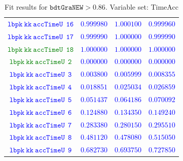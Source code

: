 \documentclass[10pt,a4paper]{article}
\begin{document}
\begin{table}[h!]
{\begin{tabular}{cccc}
\textcolor{blue}{$\mathtt{lbpk~kk~accTimeU~~16}$} & \textcolor{blue}{$0.999980$}& \textcolor{blue}{$1.000100$}& \textcolor{blue}{$0.999960$}\\
\textcolor{blue}{$\mathtt{lbpk~kk~accTimeU~~17}$} & \textcolor{blue}{$0.999990$}& \textcolor{blue}{$1.000000$}& \textcolor{blue}{$0.999990$}\\
\textcolor{Green}{$\mathtt{lbpk~kk~accTimeU~~18}$} & \textcolor{blue}{$1.000000$}& \textcolor{blue}{$1.000000$}& \textcolor{blue}{$1.000000$}\\
\textcolor{Green}{$\mathtt{lbpk~kk~accTimeU~~2}$} & \textcolor{blue}{$0.000000$}& \textcolor{blue}{$0.000000$}& \textcolor{blue}{$0.000000$}\\
\textcolor{blue}{$\mathtt{lbpk~kk~accTimeU~~3}$} & \textcolor{blue}{$0.003800$}& \textcolor{blue}{$0.005999$}& \textcolor{blue}{$0.008355$}\\
\textcolor{blue}{$\mathtt{lbpk~kk~accTimeU~~4}$} & \textcolor{blue}{$0.018851$}& \textcolor{blue}{$0.025034$}& \textcolor{blue}{$0.026859$}\\
\textcolor{blue}{$\mathtt{lbpk~kk~accTimeU~~5}$} & \textcolor{blue}{$0.051437$}& \textcolor{blue}{$0.064186$}& \textcolor{blue}{$0.070092$}\\
\textcolor{blue}{$\mathtt{lbpk~kk~accTimeU~~6}$} & \textcolor{blue}{$0.124880$}& \textcolor{blue}{$0.134350$}& \textcolor{blue}{$0.149240$}\\
\textcolor{blue}{$\mathtt{lbpk~kk~accTimeU~~7}$} & \textcolor{blue}{$0.283380$}& \textcolor{blue}{$0.280150$}& \textcolor{blue}{$0.295510$}\\
\textcolor{blue}{$\mathtt{lbpk~kk~accTimeU~~8}$} & \textcolor{blue}{$0.481120$}& \textcolor{blue}{$0.478080$}& \textcolor{blue}{$0.515050$}\\
\textcolor{blue}{$\mathtt{lbpk~kk~accTimeU~~9}$} & \textcolor{blue}{$0.682730$}& \textcolor{blue}{$0.693750$}& \textcolor{blue}{$0.727850$}\\
\hline
\end{tabular}
}
\caption{Fit results for $\mathtt{bdtGraNEW}> 0.86$.
        Variable set: TimeAcc}
\label{tab:GraNEW_0.86_TimeAcc}
\end{table}
\end{document}
